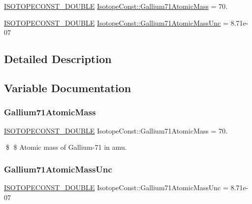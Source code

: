 \begin{DoxyCompactItemize}
\item 
\mbox{\hyperlink{group___isotope_const-_macros_ga8f45a7272ce02c0b4c65c44636ed719a}{I\+S\+O\+T\+O\+P\+E\+C\+O\+N\+S\+T\+\_\+\+D\+O\+U\+B\+LE}} \mbox{\hyperlink{group___isotope_const-_gallium-_ga71_ga1471abf2dffd47bf6099178002d1b86a}{Isotope\+Const\+::\+Gallium71\+Atomic\+Mass}} = 70.
\item 
\mbox{\hyperlink{group___isotope_const-_macros_ga8f45a7272ce02c0b4c65c44636ed719a}{I\+S\+O\+T\+O\+P\+E\+C\+O\+N\+S\+T\+\_\+\+D\+O\+U\+B\+LE}} \mbox{\hyperlink{group___isotope_const-_gallium-_ga71_gaa9c613756f001b9276182a42171a4376}{Isotope\+Const\+::\+Gallium71\+Atomic\+Mass\+Unc}} = 8.\+71e-\/07
\end{DoxyCompactItemize}


\subsection{Detailed Description}


\subsection{Variable Documentation}
\mbox{\label{group___isotope_const-_gallium-_ga71_ga1471abf2dffd47bf6099178002d1b86a}} 
\subsubsection{\texorpdfstring{Gallium71\+Atomic\+Mass}{Gallium71AtomicMass}}
{\footnotesize\ttfamily \mbox{\hyperlink{group___isotope_const-_macros_ga8f45a7272ce02c0b4c65c44636ed719a}{I\+S\+O\+T\+O\+P\+E\+C\+O\+N\+S\+T\+\_\+\+D\+O\+U\+B\+LE}} Isotope\+Const\+::\+Gallium71\+Atomic\+Mass = 70.}

\$ \$ Atomic mass of Gallium-\/71 in amu. \mbox{\label{group___isotope_const-_gallium-_ga71_gaa9c613756f001b9276182a42171a4376}} 
\subsubsection{\texorpdfstring{Gallium71\+Atomic\+Mass\+Unc}{Gallium71AtomicMassUnc}}
{\footnotesize\ttfamily \mbox{\hyperlink{group___isotope_const-_macros_ga8f45a7272ce02c0b4c65c44636ed719a}{I\+S\+O\+T\+O\+P\+E\+C\+O\+N\+S\+T\+\_\+\+D\+O\+U\+B\+LE}} Isotope\+Const\+::\+Gallium71\+Atomic\+Mass\+Unc = 8.\+71e-\/07}

